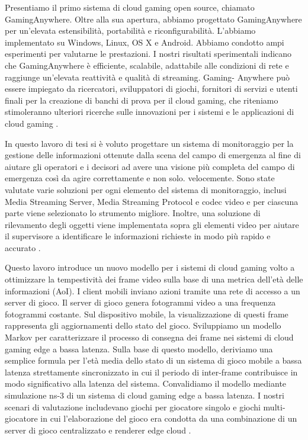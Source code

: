 Presentiamo il primo sistema di cloud gaming open source, chiamato GamingAnywhere. Oltre alla sua apertura, abbiamo progettato GamingAnywhere per un'elevata estensibilità, portabilità e riconfigurabilità. L'abbiamo implementato su Windows, Linux, OS X e Android. Abbiamo condotto ampi esperimenti per valutarne le prestazioni. I nostri risultati sperimentali indicano che GamingAnywhere è efficiente, scalabile, adattabile alle condizioni di rete e raggiunge un'elevata reattività e qualità di streaming. Gaming- Anywhere può essere impiegato da ricercatori, sviluppatori di giochi, fornitori di servizi e utenti finali per la creazione di banchi di prova per il cloud gaming, che riteniamo stimoleranno ulteriori ricerche sulle innovazioni per i sistemi e le applicazioni di cloud gaming \parencite{GamingAnywhere}.



In questo lavoro di tesi si è voluto progettare un sistema di monitoraggio per la gestione delle informazioni ottenute dalla scena del campo di emergenza al fine di aiutare gli operatori e i decisori ad avere una visione più completa del campo di emergenza così da agire correttamente e non solo. velocemente.
Sono state valutate varie soluzioni per ogni elemento del sistema di monitoraggio, inclusi Media Streaming Server, Media Streaming Protocol e codec video e per ciascuna parte viene selezionato lo strumento migliore. Inoltre, una soluzione di rilevamento degli oggetti viene implementata sopra gli elementi video per aiutare il supervisore a identificare le informazioni richieste in modo più rapido e accurato \parencite{CombinedICTTechnologiesforSupervisionofComplexOperationsinResilientCommunities}.

Questo lavoro introduce un nuovo modello per i sistemi di cloud gaming volto a ottimizzare la tempestività dei frame video sulla base di una metrica dell'età delle informazioni (AoI). I client mobili inviano azioni tramite una rete di accesso a un server di gioco. Il server di gioco genera fotogrammi video a una frequenza fotogrammi costante. Sul dispositivo mobile, la visualizzazione di questi frame rappresenta gli aggiornamenti dello stato del gioco. Sviluppiamo un modello Markov per caratterizzare il processo di consegna dei frame nei sistemi di cloud gaming edge a bassa latenza. Sulla base di questo modello, deriviamo una semplice formula per l'età media dello stato di un sistema di gioco mobile a bassa latenza strettamente sincronizzato in cui il periodo di inter-frame contribuisce in modo significativo alla latenza del sistema. Convalidiamo il modello mediante simulazione ns-3 di un sistema di cloud gaming edge a bassa latenza. I nostri scenari di valutazione includevano giochi per giocatore singolo e giochi multi-giocatore in cui l'elaborazione del gioco era condotta da una combinazione di un server di gioco centralizzato e renderer edge cloud \parencite{Timely_cloud_gaming}.


